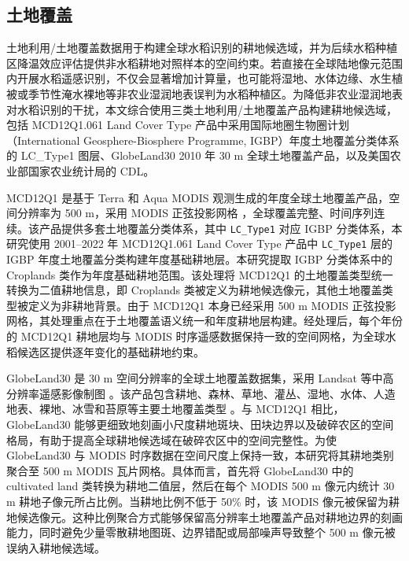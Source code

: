 \subsection{土地覆盖}
\label{sec:lulc}
土地利用/土地覆盖数据用于构建全球水稻识别的耕地候选域，并为后续水稻种植区降温效应评估提供非水稻耕地对照样本的空间约束。若直接在全球陆地像元范围内开展水稻遥感识别，不仅会显著增加计算量，也可能将湿地、水体边缘、水生植被或季节性淹水裸地等非农业湿润地表误判为水稻种植区。为降低非农业湿润地表对水稻识别的干扰，本文综合使用三类土地利用/土地覆盖产品构建耕地候选域，包括 MCD12Q1.061 Land Cover Type 产品中采用国际地圈生物圈计划（International Geosphere-Biosphere Programme, IGBP）年度土地覆盖分类体系的 LC\_Type1 图层\cite{SullaMenashe2019MODISLC}、GlobeLand30 2010 年 30 m 全球土地覆盖产品\cite{Chen2015GlobeLand30}，以及美国农业部国家农业统计局的 CDL\cite{Boryan2011CDL}。

MCD12Q1 是基于 Terra 和 Aqua MODIS 观测生成的年度全球土地覆盖产品，空间分辨率为 500 m，采用 MODIS 正弦投影网格 \cite{SullaMenashe2019MODISLC,Friedl2022MCD12Q1Data}，全球覆盖完整、时间序列连续。该产品提供多套土地覆盖分类体系，其中 \texttt{LC\_Type1} 对应 IGBP 分类体系，本研究使用 2001--2022 年 MCD12Q1.061 Land Cover Type 产品中 \texttt{LC\_Type1} 层的 IGBP 年度土地覆盖分类构建年度基础耕地层。本研究提取 IGBP 分类体系中的 Croplands 类作为年度基础耕地范围。该处理将 MCD12Q1 的土地覆盖类型统一转换为二值耕地信息，即 Croplands 类被定义为耕地候选像元，其他土地覆盖类型被定义为非耕地背景。由于 MCD12Q1 本身已经采用 500 m MODIS 正弦投影网格，其处理重点在于土地覆盖语义统一和年度耕地层构建。经处理后，每个年份的 MCD12Q1 耕地层均与 MODIS 时序遥感数据保持一致的空间网格，为全球水稻候选区提供逐年变化的基础耕地约束。

GlobeLand30 是 30 m 空间分辨率的全球土地覆盖数据集，采用 Landsat 等中高分辨率遥感影像制图 \cite{Chen2015GlobeLand30}。该产品包含耕地、森林、草地、灌丛、湿地、水体、人造地表、裸地、冰雪和苔原等主要土地覆盖类型 \cite{Chen2015GlobeLand30,Chen2014GlobeLand30Nature}。与 MCD12Q1 相比，GlobeLand30 能够更细致地刻画小尺度耕地斑块、田块边界以及破碎农区的空间格局，有助于提高全球耕地候选域在破碎农区中的空间完整性。为使 GlobeLand30 与 MODIS 时序数据在空间尺度上保持一致，本研究将其耕地类别聚合至 500 m MODIS 瓦片网格。具体而言，首先将 GlobeLand30 中的 cultivated land 类转换为耕地二值层，然后在每个 MODIS 500 m 像元内统计 30 m 耕地子像元所占比例。当耕地比例不低于 50\% 时，该 MODIS 像元被保留为耕地候选像元。这种比例聚合方式能够保留高分辨率土地覆盖产品对耕地边界的刻画能力，同时避免少量零散耕地图斑、边界错配或局部噪声导致整个 500 m 像元被误纳入耕地候选域。

